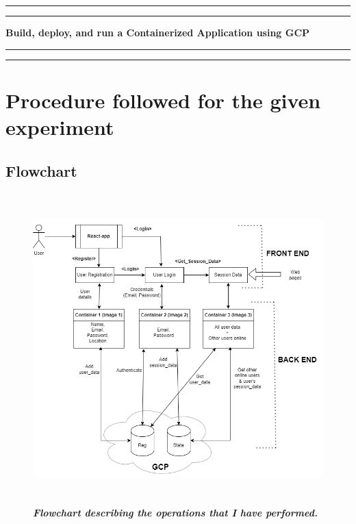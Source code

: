 
\newpage

\begin{flushright}
  \vspace{10cm}
  \rule{18cm}{5pt}
  \rule{18cm}{2pt}\vskip1cm
  \begin{center}
    \begin{bfseries}
      \Huge{\textbf{Build, deploy, and run a Containerized Application using GCP}}\\
    \end{bfseries}
  \end{center}
  \vspace{1cm}
  \rule{18cm}{2pt}
  \rule{18cm}{5pt}
\end{flushright}
\newpage

\chapter{Procedure followed for the given experiment}
    \section{Flowchart}

\begin{figure}[htp]
    \centering
    \includegraphics[scale=1, width=12cm,height=12cm]{PROBLEM 2/Flowchart.png}
    \caption{\textbf{\textit{Flowchart describing the operations that I	have performed.}}}
    \label{fig:flowchart}
\end{figure}

